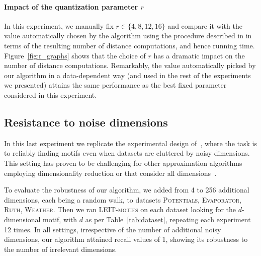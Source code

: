 \paragraph{Impact of the quantization parameter $r$}
In this experiment, we manually fix $r\in\{4,8,12,16\}$ and compare it with the value automatically chosen by the algorithm using the procedure described in  in terms of the resulting number of distance computations, and hence running time.
Figure~\ref{fig:r_graphs} shows that the choice of $r$ has a dramatic impact on the number of distance computations. 
Remarkably, the value automatically picked by our algorithm in a data-dependent way (and used in the rest of the experiments we presented) attains the same performance as the best fixed parameter considered in this experiment.


\subsection{Resistance to noise dimensions}
In this last experiment we replicate the experimental design of~\cite{keoghMP},
where the task is to reliably finding motifs even when datasets are cluttered by noisy dimensions.
This setting has proven to be challenging for other approximation algorithms employing dimensionality reduction or that consider all dimensions~\cite{keoghMP}.


To evaluate the robustness of our algorithm,
we added from 4 to 256 additional dimensions, each being a random walk, to datasets
\textsc{Potentials}, \textsc{Evaporator}, \textsc{Ruth}, \textsc{Weather}.
Then we ran \textsc{LEIT-motifs} on each dataset looking for the $d$-dimensional motif, with $d$ as per Table~\ref{tab:dataset}, repeating each experiment 12 times.
In all settings, irrespective of the number of additional noisy dimensions, our algorithm attained recall values of 1, showing its robustness to the number of irrelevant dimensions.



